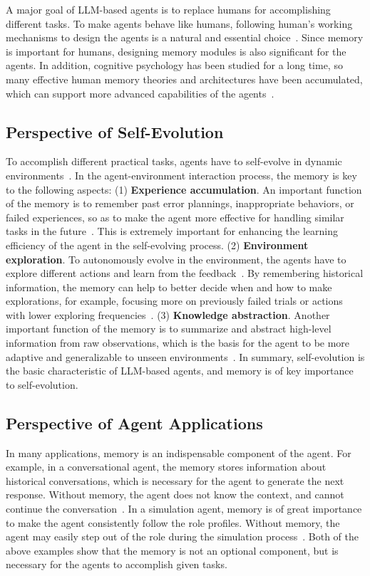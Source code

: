 \documentclass{article}
\theoremstyle{definition}
\theoremstyle{theorem}
\theoremstyle{proof}
\theoremstyle{remark}
\begin{document}
	A major goal of LLM-based agents is to replace humans for accomplishing different tasks.  
	To make agents behave like humans, following human's working mechanisms to design the agents is a natural and essential choice~\cite{laird2019soar}.
	Since memory is important for humans, designing memory modules is also significant for the agents. 
	In addition, cognitive psychology has been studied for a long time, so many effective human memory theories and architectures have been accumulated, which can support more advanced capabilities of the agents~\cite{sun2001duality}. 
	
	\subsection{Perspective of Self-Evolution}
	To accomplish different practical tasks, agents have to self-evolve in dynamic environments~\cite{survey_rl}. In the agent-environment interaction process, the memory is key to the following aspects:
	(1) \textbf{Experience accumulation}.
	An important function of the memory is to remember past error plannings, inappropriate behaviors, or failed experiences, so as to make the agent more effective for handling similar tasks in the future~\cite{synapse}. 
	This is extremely important for enhancing the learning efficiency of the agent in the self-evolving process.      
	(2) \textbf{Environment exploration}. 
	To autonomously evolve in the environment, the agents have to explore different actions and learn from the feedback~\cite{montazeralghaem2020reinforcement}. By remembering historical information, the memory can help to better decide when and how to make explorations, for example, focusing more on previously failed trials or actions with lower exploring frequencies~\cite{gitm}.
	(3) \textbf{Knowledge abstraction}.
	Another important function of the memory is to summarize and abstract high-level information from raw observations, which is the basis for the agent to be more adaptive and generalizable to unseen environments~\cite{expel}.
	In summary, self-evolution is the basic characteristic of LLM-based agents, and memory is of key importance to self-evolution.
	
	\subsection{Perspective of Agent Applications}
	In many applications, memory is an indispensable component of the agent.
	For example, in a conversational agent, the memory stores information about historical conversations, which is necessary for the agent to generate the next response. Without memory, the agent does not know the context, and cannot continue the conversation~\cite{memochat}.
	In a simulation agent, memory is of great importance to make the agent consistently follow the role profiles. 
	Without memory, the agent may easily step out of the role during the simulation process~\cite{recagent}. 
	Both of the above examples show that the memory is not an optional component, but is necessary for the agents to accomplish given tasks. 
	
\end{document}
